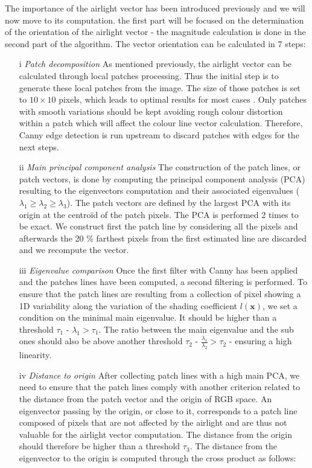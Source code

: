 \documentclass[conference]{IEEEtran}
\begin{document}
The importance of the airlight vector has been introduced previously and we will now move to its computation.
the first part will be focused on the determination of the orientation of the airlight vector - the magnitude calculation is done 
in the second part of the algorithm. The vector orientation can be calculated in 7 steps:
\begin{itemize}[]
\item[i] \textit{Patch decomposition} As mentioned previously, the airlight vector can be calculated through local patches processing. 
Thus the initial step is to generate these local patches from the image. The size of those patches is set to $10 \times 10$ pixels, which leads to optimal results for most cases \cite{airlight}. Only patches with smooth variations
should be kept avoiding rough colour distortion within a patch which will affect the colour line vector calculation.  Therefore, Canny
edge detection is run upstream to discard patches with edges for the next steps.
\item[ii] \textit{Main principal component analysis} The construction of the patch lines, or patch vectors, is done by computing the principal component analysis (PCA) resulting to the eigenvectors computation and their
associated eigenvalues ($\lambda_1 \geq \lambda_2 \geq \lambda_3$).  The patch vectors are defined by the largest PCA with its origin at the centroïd of the patch pixels.
The PCA is performed 2 times to be exact. We construct first the patch line by considering all the pixels and afterwards the 20 \% farthest
pixels from the first estimated line are discarded and we recompute the vector.  
\item[iii] \textit{Eigenvalue comparison} Once the first filter with Canny has been applied and the patches lines have been computed, 
a second filtering is performed.  To ensure that the patch lines are resulting from a collection of pixel showing a 1D variability 
along the variation of the shading coefficient $l(\mathbf{x})$, we set a condition on the minimal main eigenvalue.
It should be higher than a threshold $\tau_1$ - $\lambda_1 > \tau_1$. 
The ratio between the main eigenvalue and the sub ones should also be above another threshold $\tau_2$ - $\frac{\lambda_1}{\lambda_2} > \tau_2$ - 
ensuring a high linearity.
\item[iv] \textit{Distance to origin} After collecting patch lines with a high main PCA, we need to ensure that the patch lines 
comply with another criterion related to the distance from the patch vector and the origin of RGB space. 
An eigenvector passing by the origin, or close to it, corresponds to a patch line composed of pixels that are not affected by the airlight and are thus not valuable for the airlight vector computation.
The distance from the origin should therefore be higher than a threshold $\tau_3$.  The distance from the eigenvector to the origin
is computed through the cross product as follows:


\end{itemize}
\end{document}
